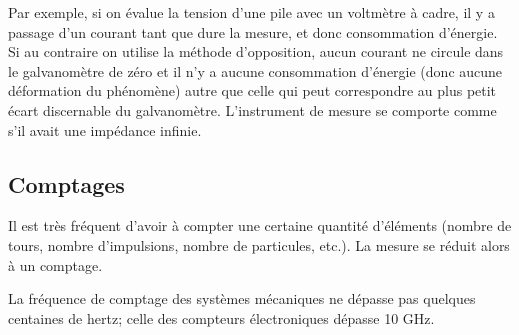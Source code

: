 Par exemple, si on évalue la tension d'une pile avec un voltmètre à cadre, il y a passage d'un courant tant que dure la mesure, et donc consommation d'énergie. Si au contraire on utilise la méthode d'opposition, aucun courant ne circule dans le galvanomètre de zéro et il n'y a aucune consommation d'énergie (donc aucune déformation du phénomène) autre que celle qui peut correspondre au plus petit écart discernable du galvanomètre. L'instrument de mesure se comporte comme s'il avait une impédance infinie.

\subsection{Comptages}

Il est très fréquent d'avoir à compter une certaine quantité d'éléments (nombre de tours, nombre d'impulsions, nombre de particules, etc.). La mesure se réduit alors à un comptage.

La fréquence de comptage des systèmes mécaniques ne dépasse pas quelques centaines de hertz; celle des compteurs électroniques dépasse 10 GHz.
